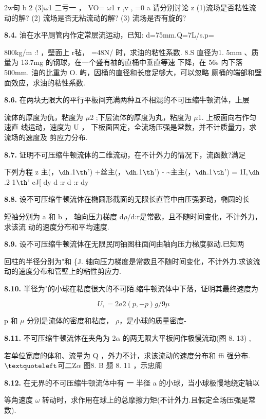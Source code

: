 2w句 b 2 (3)$\omega$1 二亏一 ， VO= $\omega$1 r ,v , =0 a 请分别讨论 z (1)流场是否粘性流动的解? (2) 流场是否无粘流动的解? (3) 流场是否有旋的?

\noindent\textbf{8.4.} 油在水平厕管内作定常层流运动，已知: d=75mm.Q=7L/s.p=

800kg/m :! ，壁面上 r毡， =48N/ 时，求油的粘性系数. 8.S 直径为1. 5mm 、质量为 13.7mg 的钢球，在一个盛有袖的直桶中垂直等速 下降，在 56s 内下落 500mm. 油的比重为 O. 屿，因桶的直径和长度足够大，可以忽略 厕桶的端部和壁面效应，求油的粘性系数.

\noindent\textbf{8.6.} 在两块无限大的平行平板间充满两种互不相混的不可压缩牛顿流体，上层

流体的厚度为仇，粘度为 $\mu$2 ;下层流体的厚度为丸，粘度为 $\mu$1. 上板面向右作匀速直 线运动，速度为 U ， 下板面固定，全流场压强是常数，并不计质量力，求流场的速度及 剪应力分布.

\noindent\textbf{8.7.} 证明不可压缩牛顿流体的二维流动，在不计外力的情况下，流函数?满足

下列方程 z 主(，${\rm ð}$.1${\rm þ}$') +丝主(，${\rm ð}$.1${\rm þ}$') - \textasciitilde{}主主(，${\rm ð}$.1${\rm þ}$') = 1I,${\rm ð}$.2 1${\rm þ}$' cJ[ dy d :r d :r dy

\noindent\textbf{8.8.} 设不可压缩牛顿流体在椭圆形截面的无限长直管中由压强驱动，椭圆的长

短袖分别为 a 和 b ， 轴向压力梯度 d$\rho$/d:r是常数，且不随时间变化，不计外力，求该流 动的速度分布和平均速度.

\noindent\textbf{8.9.} 设不可压缩牛顿流体在无限民同铀图柱面间由轴向压力梯度驱动.已知两

回柱的半径分别为"和 \{J. 轴向压力梯度是常数且不随时间变化，不计外力.求该流 动的速度分布和管壁上的粘性剪应力.

\noindent\textbf{8.10.} 半径为"的小球在粘度很大的不可陌.缩牛顿流体中下落，证明其最终速度为

\[U, = 2a2 (p, - p)g/9\mu \]

p 和 $\mu$ 分别是流体的密度和粘度， $\rho$，是小球的质量密度-

\noindent\textbf{8.11.} 不可压缩牛顿流体在夹角为 2$\alpha$ 的两无限大平板间作极慢流动(图 8. 13) ,

若单位宽度的体和、流量为 Q ，外力不计，求该流动的速度分布和 ffi 强分布. ${\rm ‘}$可二Z$\alpha$ 图8. B 题 8. 11 ，示忠阁

\noindent\textbf{8.12.} 在无界的不可压缩牛顿流体中有 一 半径 a 的小球，当小球极慢地绕定轴以

等角速度 $\omega$ 转动时，求作用在球上的总摩擦力矩(不计外力.且假定全场压强是常数).

